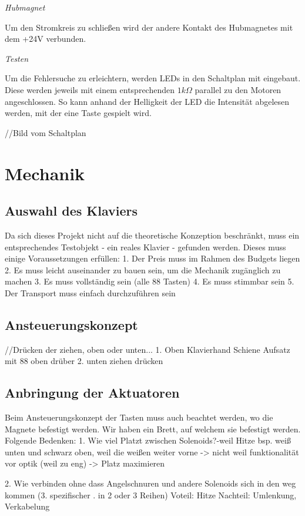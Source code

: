 \textit{Hubmagnet}

Um den Stromkreis zu schließen wird der andere Kontakt des Hubmagnetes mit dem +24V verbunden.

\textit{Testen}

Um die Fehlersuche zu erleichtern, werden LEDs in den Schaltplan mit eingebaut.
Diese werden jeweils mit einem entsprechenden $1k\Omega$ parallel zu den Motoren angeschlossen.
So kann anhand der Helligkeit der LED die Intensität abgelesen werden, mit der eine Taste gespielt wird.

//Bild vom Schaltplan

\section{Mechanik}\label{vorgehenHW}

\subsection{Auswahl des Klaviers}

Da sich dieses Projekt nicht auf die theoretische Konzeption beschränkt, muss ein entsprechendes Testobjekt - ein reales Klavier - gefunden werden.
Dieses muss einige Voraussetzungen erfüllen:
	1. Der Preis muss im Rahmen des Budgets liegen
	2. Es muss leicht auseinander zu bauen sein, um die Mechanik zugänglich zu machen
	3. Es muss vollständig sein (alle 88 Tasten)
	4. Es muss stimmbar sein
	5. Der Transport muss einfach durchzuführen sein


\subsection{Ansteuerungskonzept}

//Drücken der ziehen, oben oder unten...
1. Oben
	Klavierhand
	Schiene
	Aufsatz mit 88 oben drüber
2. unten
	ziehen
	drücken

\subsection{Anbringung der Aktuatoren}
Beim Ansteuerungskonzept der Tasten muss auch beachtet werden, wo die Magnete befestigt werden.
Wir haben ein Brett, auf welchem sie befestigt werden. Folgende Bedenken:
1. Wie viel Platzt zwischen Solenoids?-weil Hitze
bsp. weiß unten und schwarz oben, weil die weißen weiter vorne
	-> nicht weil funktionalität vor optik (weil zu eng)
 -> Platz maximieren

2. Wie verbinden ohne dass Angelschnuren und andere Solenoids sich in den weg kommen
(3. spezifischer . in 2 oder 3 Reihen)
Voteil: Hitze
Nachteil: Umlenkung, Verkabelung

